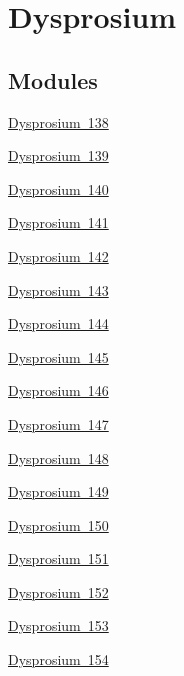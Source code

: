 \hypertarget{group___isotope_const-_dysprosium}{}\section{Dysprosium}
\label{group___isotope_const-_dysprosium}
\subsection*{Modules}
\begin{DoxyCompactItemize}
\item 
\mbox{\hyperlink{group___isotope_const-_dysprosium-_dy138}{Dysprosium 138}}
\item 
\mbox{\hyperlink{group___isotope_const-_dysprosium-_dy139}{Dysprosium 139}}
\item 
\mbox{\hyperlink{group___isotope_const-_dysprosium-_dy140}{Dysprosium 140}}
\item 
\mbox{\hyperlink{group___isotope_const-_dysprosium-_dy141}{Dysprosium 141}}
\item 
\mbox{\hyperlink{group___isotope_const-_dysprosium-_dy142}{Dysprosium 142}}
\item 
\mbox{\hyperlink{group___isotope_const-_dysprosium-_dy143}{Dysprosium 143}}
\item 
\mbox{\hyperlink{group___isotope_const-_dysprosium-_dy144}{Dysprosium 144}}
\item 
\mbox{\hyperlink{group___isotope_const-_dysprosium-_dy145}{Dysprosium 145}}
\item 
\mbox{\hyperlink{group___isotope_const-_dysprosium-_dy146}{Dysprosium 146}}
\item 
\mbox{\hyperlink{group___isotope_const-_dysprosium-_dy147}{Dysprosium 147}}
\item 
\mbox{\hyperlink{group___isotope_const-_dysprosium-_dy148}{Dysprosium 148}}
\item 
\mbox{\hyperlink{group___isotope_const-_dysprosium-_dy149}{Dysprosium 149}}
\item 
\mbox{\hyperlink{group___isotope_const-_dysprosium-_dy150}{Dysprosium 150}}
\item 
\mbox{\hyperlink{group___isotope_const-_dysprosium-_dy151}{Dysprosium 151}}
\item 
\mbox{\hyperlink{group___isotope_const-_dysprosium-_dy152}{Dysprosium 152}}
\item 
\mbox{\hyperlink{group___isotope_const-_dysprosium-_dy153}{Dysprosium 153}}
\item 
\mbox{\hyperlink{group___isotope_const-_dysprosium-_dy154}{Dysprosium 154}}

\end{DoxyCompactItemize}
